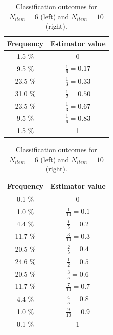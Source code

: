 \documentclass[a4paper,12pt]{article}
\begin{document}
\begin{table}
\parbox{.5\linewidth}{
\centering
\begin{tabular}{|cc|}
\hline
\textbf{Frequency} & \textbf{Estimator value} \\
\hline \hline
1.5 \%                            & 0                                \\
9.5 \%                            & $\frac{1}{6} = 0.17$                  \\
23.5 \%                           & $\frac{1}{3} = 0.33$                   \\
31.0 \%                             & $\frac{1}{2} = 0.50$                  \\
23.5 \%                           & $\frac{1}{3} = 0.67$                  \\
9.5 \%                            & $\frac{1}{6} = 0.83$                  \\
1.5 \%                            & 1  \\
\hline
\end{tabular}
\caption{Classification outcomes for $N_{item}=6$ (left) and $N_{item}=10$ (right).}
\label{Table::probs}
}
\hfill
\parbox{.5\linewidth}{
\centering
\begin{tabular}{|cc|}
\hline 
\textbf{Frequency} & \textbf{Estimator value} \\
\hline \hline
0.1 \%                            & 0                           \\
1.0 \%                            & $\frac{1}{10} = 0.1$              \\
4.4 \%                            & $\frac{1}{5} = 0.2$               \\
11.7 \%                           & $\frac{3}{10} = 0.3$              \\
20.5 \%                           & $\frac{2}{5} = 0.4$               \\
24.6 \%                           & $\frac{1}{2} = 0.5$               \\
20.5 \%                           & $\frac{3}{5} = 0.6$               \\
11.7 \%                           & $\frac{7}{10} = 0.7$              \\
4.4  \%                           & $\frac{4}{5} = 0.8$               \\
1.0  \%                           & $\frac{9}{10} = 0.9$              \\
0.1  \%                           & 1  \\
\hline
\end{tabular}
}
\end{table}
\end{document}
